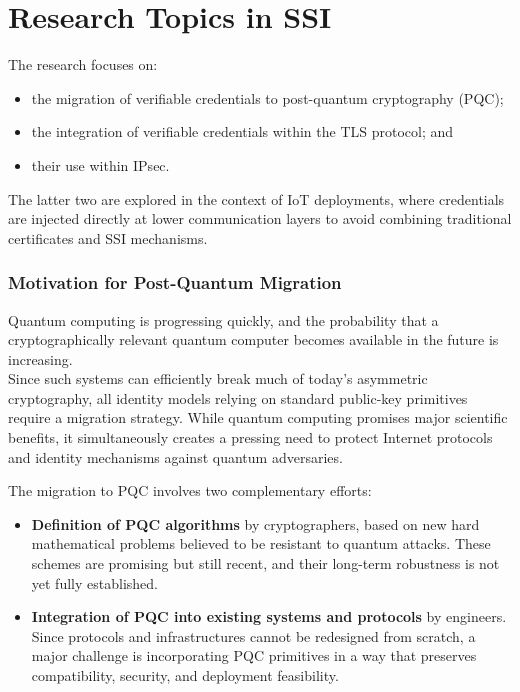 \section{Research Topics in SSI}

The research focuses on:
\begin{itemize}
    \item the migration of verifiable credentials to post-quantum cryptography (PQC);
    \item the integration of verifiable credentials within the TLS protocol; and
    \item their use within IPsec.
\end{itemize}

\noindent
The latter two are explored in the context of IoT deployments, where credentials are injected directly at lower communication layers to avoid combining traditional certificates and SSI mechanisms.

\subsubsection*{Motivation for Post-Quantum Migration}
Quantum computing is progressing quickly, and the probability that a cryptographically relevant quantum computer becomes available in the future is increasing.\\
Since such systems can efficiently break much of today’s asymmetric cryptography, all identity models relying on standard public-key primitives require a migration strategy. While quantum computing promises major scientific benefits, it simultaneously creates a pressing need to protect Internet protocols and identity mechanisms against quantum adversaries. 
\smallskip

\noindent
The migration to PQC involves two complementary efforts:
\begin{itemize}
    \item \textbf{Definition of PQC algorithms} by cryptographers, based on new hard mathematical problems believed to be resistant to quantum attacks. These schemes are promising but still recent, and their long-term robustness is not yet fully established.
    \item \textbf{Integration of PQC into existing systems and protocols} by engineers. Since protocols and infrastructures cannot be redesigned from scratch, a major challenge is incorporating PQC primitives in a way that preserves compatibility, security, and deployment feasibility.
\end{itemize}

